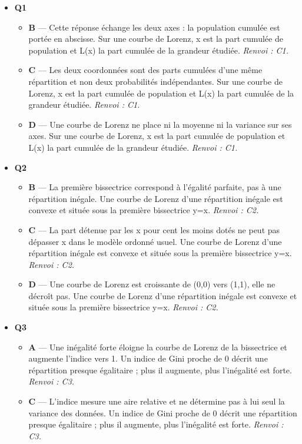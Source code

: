 \begin{itemize}
  \item \textbf{Q1}
  \begin{itemize}
    \item \textbf{B} — Cette réponse échange les deux axes : la population cumulée est portée en abscisse. Sur une courbe de Lorenz, x est la part cumulée de population et L(x) la part cumulée de la grandeur étudiée. \emph{Renvoi : C1.}
    \item \textbf{C} — Les deux coordonnées sont des parts cumulées d'une même répartition et non deux probabilités indépendantes. Sur une courbe de Lorenz, x est la part cumulée de population et L(x) la part cumulée de la grandeur étudiée. \emph{Renvoi : C1.}
    \item \textbf{D} — Une courbe de Lorenz ne place ni la moyenne ni la variance sur ses axes. Sur une courbe de Lorenz, x est la part cumulée de population et L(x) la part cumulée de la grandeur étudiée. \emph{Renvoi : C1.}
  \end{itemize}
  \item \textbf{Q2}
  \begin{itemize}
    \item \textbf{B} — La première bissectrice correspond à l'égalité parfaite, pas à une répartition inégale. Une courbe de Lorenz d'une répartition inégale est convexe et située sous la première bissectrice y=x. \emph{Renvoi : C2.}
    \item \textbf{C} — La part détenue par les x pour cent les moins dotés ne peut pas dépasser x dans le modèle ordonné usuel. Une courbe de Lorenz d'une répartition inégale est convexe et située sous la première bissectrice y=x. \emph{Renvoi : C2.}
    \item \textbf{D} — Une courbe de Lorenz est croissante de (0,0) vers (1,1), elle ne décroît pas. Une courbe de Lorenz d'une répartition inégale est convexe et située sous la première bissectrice y=x. \emph{Renvoi : C2.}
  \end{itemize}
  \item \textbf{Q3}
  \begin{itemize}
    \item \textbf{A} — Une inégalité forte éloigne la courbe de Lorenz de la bissectrice et augmente l'indice vers 1. Un indice de Gini proche de 0 décrit une répartition presque égalitaire ; plus il augmente, plus l'inégalité est forte. \emph{Renvoi : C3.}
    \item \textbf{C} — L'indice mesure une aire relative et ne détermine pas à lui seul la variance des données. Un indice de Gini proche de 0 décrit une répartition presque égalitaire ; plus il augmente, plus l'inégalité est forte. \emph{Renvoi : C3.}

\end{itemize}
\end{itemize}

